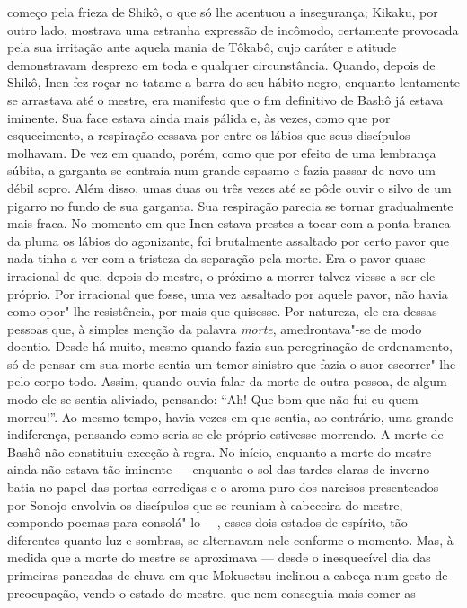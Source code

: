 começo pela frieza de Shikô, o que só lhe acentuou a insegurança;
Kikaku, por outro lado, mostrava uma estranha expressão de incômodo,
certamente provocada pela sua irritação ante aquela mania de Tôkabô,
cujo caráter e atitude demonstravam desprezo em toda e qualquer
circunstância. Quando, depois de Shikô, Inen fez roçar no tatame a
barra do seu hábito negro, enquanto lentamente se arrastava até o
mestre, era manifesto que o fim definitivo de Bashô já estava iminente.
Sua face estava ainda mais pálida e, às vezes, como que por
esquecimento, a respiração cessava por entre os lábios que seus
discípulos molhavam. De vez em quando, porém, como que por efeito de
uma lembrança súbita, a garganta se contraía num grande espasmo e fazia
passar de novo um débil sopro. Além disso, umas duas ou três vezes até
se pôde ouvir o silvo de um pigarro no fundo de sua garganta. Sua
respiração parecia se tornar gradualmente mais fraca. No momento em que
Inen estava prestes a tocar com a ponta branca da pluma os lábios do
agonizante, foi brutalmente assaltado por certo pavor que nada tinha a
ver com a tristeza da separação pela morte. Era o pavor quase
irracional de que, depois do mestre, o próximo a morrer talvez viesse a
ser ele próprio. Por irracional que fosse, uma vez assaltado por aquele
pavor, não havia como opor"-lhe resistência, por mais que quisesse. Por
natureza, ele era dessas pessoas que, à simples menção da palavra
\textit{morte}, amedrontava"-se de modo doentio. Desde há muito, mesmo
quando fazia sua peregrinação de ordenamento, só de pensar em sua morte
sentia um temor sinistro que fazia o suor escorrer"-lhe pelo corpo todo.
Assim, quando ouvia falar da morte de outra pessoa, de algum modo ele
se sentia aliviado, pensando: ``Ah! Que bom que não fui eu quem
morreu!''. Ao mesmo tempo, havia vezes em que sentia, ao contrário, uma
grande indiferença, pensando como seria se ele próprio estivesse
morrendo. A morte de Bashô não constituiu exceção à regra. No início,
enquanto a morte do mestre ainda não estava tão iminente --- enquanto o
sol das tardes claras de inverno batia no papel das portas corrediças e 
o aroma puro dos narcisos presenteados por Sonojo envolvia os
discípulos que se reuniam à cabeceira do mestre, compondo poemas para
consolá"-lo ---, esses dois estados de espírito, tão diferentes quanto luz
e sombras, se alternavam nele conforme o momento. Mas, à medida que a
morte do mestre se aproximava --- desde o inesquecível dia das primeiras
pancadas de chuva em que Mokusetsu inclinou a cabeça num gesto de
preocupação, vendo o estado do mestre, que nem conseguia mais comer as
